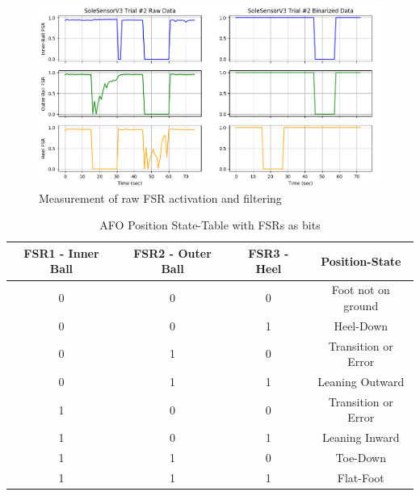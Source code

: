 \begin{figure}[h!]
    \centering
    \includegraphics[scale=0.45]{images/mech_design/SoleSensorV3T2_Raw_v_Binarized.png}
    \caption[Measurement of raw FSR]{Measurement of raw FSR activation and filtering \cite{Michaels2020}}
    \label{fig:FSRBinarized}
\end{figure}


\begin{table}[h!]
    \centering
    \begin{tabular}{|c|c|c|c|}
    \hline
    FSR1 - Inner Ball & FSR2 - Outer Ball & FSR3 - Heel & Position-State \\[0.5ex]
    \hline\hline
    0 & 0 & 0 & Foot not on ground \\
    \hline
    0 & 0 & 1 & Heel-Down \\
    \hline
    0 & 1 & 0 & Transition or Error \\
    \hline
    0 & 1 & 1 & Leaning Outward \\
    \hline
    1 & 0 & 0 & Transition or Error \\
    \hline
    1 & 0 & 1 & Leaning Inward \\
    \hline
    1 & 1 & 0 & Toe-Down \\
    \hline
    1 & 1 & 1 & Flat-Foot \\
    \hline
    \end{tabular}
    \caption[AFO State Table]{AFO Position State-Table with FSRs as bits \cite{Michaels2020}}
    \label{tab:statetable}
\end{table}




